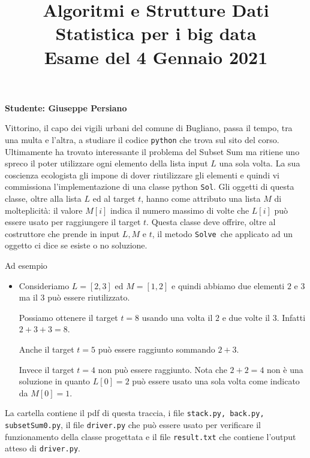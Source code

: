 \documentclass{amsart}
\begin{document}
\title{Algoritmi e Strutture Dati\\
Statistica per i big data\\
Esame del 4 Gennaio 2021
}


\newcommand{\NomeStudente}{Giuseppe Persiano}
\newcommand{\nomeClasse}{{\tt{Sol}}}
\newcommand{\nomeMetodo}{{\tt{Solve}}}
\newcommand{\oraconsegna}{10:35}
\newcommand{\dataoggi}{4 Gennaio, 2021}


\maketitle

\hfill{{\bf Studente: \NomeStudente}}

\smallskip
Vittorino, il capo dei vigili urbani del comune di Bugliano, passa il tempo,
tra una multa e l'altra, a studiare il codice {\tt python} che trova
sul sito del corso. Ultimamente ha trovato interessante il problema 
del Subset Sum ma ritiene uno spreco il poter utilizzare ogni elemento
della lista input $L$ una sola volta.
La sua coscienza ecologista gli impone di dover riutilizzare gli elementi
e quindi vi commissiona l'implementazione di una classe python \nomeClasse.
Gli oggetti di questa classe, oltre alla lista $L$ ed al target $t$,
hanno come attributo una lista $M$ di molteplicit\`a:
il valore $M[i]$ indica il numero massimo di volte che $L[i]$ pu\`o essere 
usato per raggiungere il target $t$.
Questa classe deve offrire, oltre al costruttore che prende
in input $L,M$ e $t$, 
il metodo \nomeMetodo\ che applicato ad un oggetto ci dice se esiste
o no soluzione.


Ad esempio
\begin{itemize}
\item Consideriamo $L=[2,3]$ ed $M=[1,2]$ e quindi
        abbiamo due elementi $2$ e $3$ ma il $3$ pu\`o essere riutilizzato.

\noindent
    Possiamo ottenere il target $t=8$ usando una volta il $2$
        e due volte il $3$. Infatti $2+3+3=8$.

\noindent
    Anche il target $t=5$ pu\`o essere raggiunto sommando $2+3$.

\noindent
    Invece il target $t=4$ non pu\`o essere raggiunto. Nota che $2+2=4$ non
    \`e una soluzione in quanto $L[0]=2$ pu\`o essere usato una sola volta
    come indicato da $M[0]=1$.

\end{itemize}

\medskip{}
La cartella contiene il pdf di questa traccia, i file
{\tt stack.py, back.py, subsetSum0.py},
il file {\tt driver.py} che pu\`o essere usato
per verificare il funzionamento della classe progettata
e il file  {\tt result.txt} che contiene l'output atteso di {\tt driver.py}.
\end{document}
